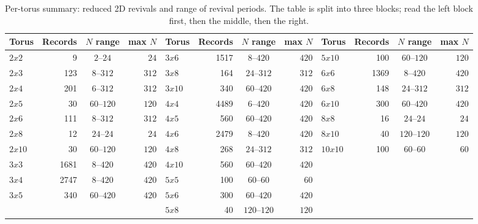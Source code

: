 \documentclass[aps,pra,reprint,amsmath,amssymb,superscriptaddress,floatfix]{revtex4-2}
\def\times{x}%
\begin{document}
\par
\begin{table}[htbp]
\centering
\caption{Per-torus summary: reduced 2D revivals and range of revival
periods. The table is split into three blocks; read the left block
first, then the middle, then the right.}
\label{tab:tori-summary}
\begin{tabular}{lrcr|lrcr|lrcr}
\toprule
Torus & Records & $N$ range & max $N$
  & Torus & Records & $N$ range & max $N$
  & Torus & Records & $N$ range & max $N$ \\
\midrule
$2\times2$   & 9    & $2$--$24$    & $24$
  & $3\times6$   & 1517 & $8$--$420$   & $420$
  & $5\times10$  & 100  & $60$--$120$  & $120$ \\
$2\times3$   & 123  & $8$--$312$   & $312$
  & $3\times8$   & 164  & $24$--$312$  & $312$
  & $6\times6$   & 1369 & $8$--$420$   & $420$ \\
$2\times4$   & 201  & $6$--$312$   & $312$
  & $3\times10$  & 340  & $60$--$420$  & $420$
  & $6\times8$   & 148  & $24$--$312$  & $312$ \\
$2\times5$   & 30   & $60$--$120$  & $120$
  & $4\times4$   & 4489 & $6$--$420$   & $420$
  & $6\times10$  & 300  & $60$--$420$  & $420$ \\
$2\times6$   & 111  & $8$--$312$   & $312$
  & $4\times5$   & 560  & $60$--$420$  & $420$
  & $8\times8$   & 16   & $24$--$24$   & $24$ \\
$2\times8$   & 12   & $24$--$24$   & $24$
  & $4\times6$   & 2479 & $8$--$420$   & $420$
  & $8\times10$  & 40   & $120$--$120$ & $120$ \\
$2\times10$  & 30   & $60$--$120$  & $120$
  & $4\times8$   & 268  & $24$--$312$  & $312$
  & $10\times10$ & 100  & $60$--$60$   & $60$ \\
$3\times3$   & 1681 & $8$--$420$   & $420$
  & $4\times10$  & 560  & $60$--$420$  & $420$
  &              &      &              &      \\
$3\times4$   & 2747 & $8$--$420$   & $420$
  & $5\times5$   & 100  & $60$--$60$   & $60$
  &              &      &              &      \\
$3\times5$   & 340  & $60$--$420$  & $420$
  & $5\times6$   & 300  & $60$--$420$  & $420$
  &              &      &              &      \\
             &      &              &
  & $5\times8$   & 40   & $120$--$120$ & $120$
  &              &      &              &      \\
\bottomrule
\end{tabular}
\end{table}
\end{document}
